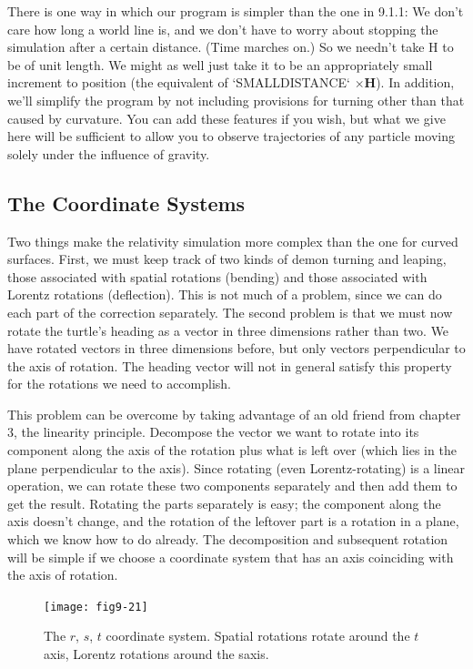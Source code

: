\documentclass{book}
\begin{document}
There is one way in which our program is simpler than the one in
9.1.1: We don't care how long a world line is, and we don't have to
worry about stopping the simulation after a certain distance. (Time
marches on.) So we needn't take H to be of unit length. We might
as well just take it to be an appropriately small increment to position
(the equivalent of \textsc{`SMALLDISTANCE`} $\times \mathbf{H}$). In addition, we'll simplify the
program by not including provisions for turning other than that caused
by curvature. You can add these features if you wish, but what we give
here will be sufficient to allow you to observe trajectories of any particle
moving solely under the influence of gravity.

\subsection{The Coordinate Systems}

Two things make the relativity simulation more complex than the one for
curved surfaces. First, we must keep track of two kinds of demon turning
and leaping, those associated with spatial rotations (bending) and those
associated with Lorentz rotations (deflection). This is not much of a
problem, since we can do each part of the correction separately. The
second problem is that we must now rotate the turtle's heading as a
vector in three dimensions rather than two. We have rotated vectors in
three dimensions before, but only vectors perpendicular to the axis of
rotation. The heading vector will not in general satisfy this property for
the rotations we need to accomplish.

This problem can be overcome by taking advantage of an old friend
from chapter 3, the linearity principle. Decompose the vector we want
to rotate into its component along the axis of the rotation plus what
is left over (which lies in the plane perpendicular to the axis). Since
rotating (even Lorentz-rotating) is a linear operation, we can rotate
these two components separately and then add them to get the result.
Rotating the parts separately is easy; the component along the axis
doesn't change, and the rotation of the leftover part is a rotation in
a plane, which we know how to do already. The decomposition and
subsequent rotation will be simple if we choose a coordinate system that
has an axis coinciding with the axis of rotation.

\begin{figure}
\begin{center}
\texttt{[image: fig9-21]}
\caption{The $r$, $s$, $t$ coordinate system. Spatial rotations rotate around the $t$ axis, Lorentz rotations around the saxis.}
\end{center}
\end{figure}
\end{document}

